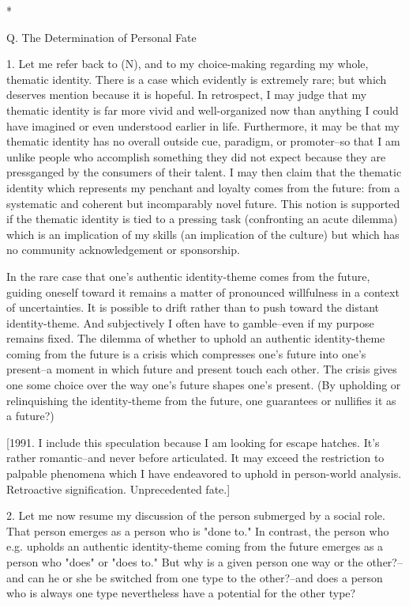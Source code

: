 *

Q. The Determination of Personal Fate

1. Let me refer back to (N), and to my choice-making regarding my whole, thematic identity. There is a case which evidently is extremely rare; but which deserves mention because it is hopeful. In retrospect, I may judge that my thematic identity is far more vivid and well-organized now than anything I could have imagined or even understood earlier in life. Furthermore, it may be that my thematic identity has no overall outside cue, paradigm, or promoter--so that I am unlike people who accomplish something they did not expect because they are pressganged by the consumers of their talent. I may then claim that the thematic identity which represents my penchant and loyalty comes from the future: from a systematic and coherent but incomparably novel future. This notion is supported if the thematic identity is tied to a pressing task (confronting an acute dilemma) which is an implication of my skills (an implication of the culture) but which has no community acknowledgement or sponsorship.

In the rare case that one's authentic identity-theme comes from the future, guiding oneself toward it remains a matter of pronounced willfulness in a context of uncertainties. It is possible to drift rather than to push toward the distant identity-theme. And subjectively I often have to gamble--even if my purpose remains fixed. The dilemma of whether to uphold an authentic identity-theme coming from the future is a crisis which compresses one's future into one's present--a moment in which future and present touch each other. The crisis gives one some choice over the way one's future shapes one's present. (By upholding or relinquishing the identity-theme from the future, one guarantees or nullifies it as a future?)

[1991. I include this speculation because I am looking for escape hatches. It's rather romantic--and never before articulated. It may exceed the restriction to palpable phenomena which I have endeavored to uphold in person-world analysis. Retroactive signification. Unprecedented fate.]

2. Let me now resume my discussion of the person submerged by a social role. That person emerges as a person who is "done to." In contrast, the person who e.g. upholds an authentic identity-theme coming from the future emerges as a person who "does" or "does to." But why is a given person one way or the other?--and can he or she be switched from one type to the other?--and does a person who is always one type nevertheless have a potential for the other type?

